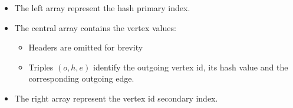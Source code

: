 \begin{itemize}
	\footnotesize
	\item  {The left array represent the hash primary index.}
	\item The central array contains the vertex values:
	\begin{itemize}
		\item Headers are omitted for brevity
		\item Triples $(o,h,e)$ identify the outgoing vertex id, its hash value
			and the corresponding outgoing edge.
	\end{itemize}
	\item The right array represent the vertex id secondary index.
\end{itemize}